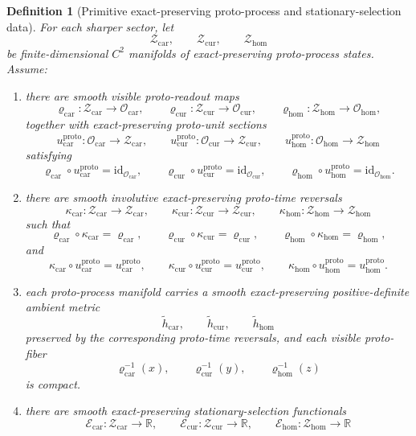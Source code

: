 \documentclass[11pt]{article}
\newcommand{\TensorObjClass}{\mathcal O_{\mathrm{car}}}
\newcommand{\CurObjClass}{\mathcal O_{\mathrm{cur}}}
\newcommand{\HomObjClass}{\mathcal O_{\mathrm{hom}}}
\newcommand{\TensorProtoSpace}{\mathcal Z_{\mathrm{car}}}
\newcommand{\CurProtoSpace}{\mathcal Z_{\mathrm{cur}}}
\newcommand{\HomProtoSpace}{\mathcal Z_{\mathrm{hom}}}
\newcommand{\TensorProtoRead}{\varrho_{\mathrm{car}}}
\newcommand{\CurProtoRead}{\varrho_{\mathrm{cur}}}
\newcommand{\HomProtoRead}{\varrho_{\mathrm{hom}}}
\newcommand{\TensorProtoUnit}{u_{\mathrm{car}}^{\mathrm{proto}}}
\newcommand{\CurProtoUnit}{u_{\mathrm{cur}}^{\mathrm{proto}}}
\newcommand{\HomProtoUnit}{u_{\mathrm{hom}}^{\mathrm{proto}}}
\newcommand{\TensorProtoTimeRev}{\kappa_{\mathrm{car}}}
\newcommand{\CurProtoTimeRev}{\kappa_{\mathrm{cur}}}
\newcommand{\HomProtoTimeRev}{\kappa_{\mathrm{hom}}}
\newcommand{\TensorProtoAmbientMetric}{\widetilde h_{\mathrm{car}}}
\newcommand{\CurProtoAmbientMetric}{\widetilde h_{\mathrm{cur}}}
\newcommand{\HomProtoAmbientMetric}{\widetilde h_{\mathrm{hom}}}
\newcommand{\TensorSelection}{\mathscr E_{\mathrm{car}}}
\newcommand{\CurSelection}{\mathscr E_{\mathrm{cur}}}
\newcommand{\HomSelection}{\mathscr E_{\mathrm{hom}}}
\newtheorem{definition}{Definition}
\begin{document}
\begin{definition}[Primitive exact-preserving proto-process and stationary-selection data]
\label{def:proto_process}
For each sharper sector, let
\[
\TensorProtoSpace,\qquad
\CurProtoSpace,\qquad
\HomProtoSpace
\]
be finite-dimensional \(C^2\) manifolds of exact-preserving proto-process states. Assume:
\begin{enumerate}
    \item there are smooth visible proto-readout maps
    \[
    \TensorProtoRead:\TensorProtoSpace\to\TensorObjClass,\qquad
    \CurProtoRead:\CurProtoSpace\to\CurObjClass,\qquad
    \HomProtoRead:\HomProtoSpace\to\HomObjClass,
    \]
    together with exact-preserving proto-unit sections
    \[
    \TensorProtoUnit:\TensorObjClass\to\TensorProtoSpace,\qquad
    \CurProtoUnit:\CurObjClass\to\CurProtoSpace,\qquad
    \HomProtoUnit:\HomObjClass\to\HomProtoSpace
    \]
    satisfying
    \[
    \TensorProtoRead\circ\TensorProtoUnit=\mathrm{id}_{\TensorObjClass},\qquad
    \CurProtoRead\circ\CurProtoUnit=\mathrm{id}_{\CurObjClass},\qquad
    \HomProtoRead\circ\HomProtoUnit=\mathrm{id}_{\HomObjClass}.
    \]
    \item there are smooth involutive exact-preserving proto-time reversals
    \[
    \TensorProtoTimeRev:\TensorProtoSpace\to\TensorProtoSpace,\qquad
    \CurProtoTimeRev:\CurProtoSpace\to\CurProtoSpace,\qquad
    \HomProtoTimeRev:\HomProtoSpace\to\HomProtoSpace
    \]
    such that
    \[
    \TensorProtoRead\circ\TensorProtoTimeRev=\TensorProtoRead,\qquad
    \CurProtoRead\circ\CurProtoTimeRev=\CurProtoRead,\qquad
    \HomProtoRead\circ\HomProtoTimeRev=\HomProtoRead,
    \]
    and
    \[
    \TensorProtoTimeRev\circ\TensorProtoUnit=\TensorProtoUnit,\qquad
    \CurProtoTimeRev\circ\CurProtoUnit=\CurProtoUnit,\qquad
    \HomProtoTimeRev\circ\HomProtoUnit=\HomProtoUnit.
    \]
    \item each proto-process manifold carries a smooth exact-preserving positive-definite ambient metric
    \[
    \TensorProtoAmbientMetric,\qquad
    \CurProtoAmbientMetric,\qquad
    \HomProtoAmbientMetric
    \]
    preserved by the corresponding proto-time reversals, and each visible proto-fiber
    \[
    \TensorProtoRead^{-1}(x),\qquad
    \CurProtoRead^{-1}(y),\qquad
    \HomProtoRead^{-1}(z)
    \]
    is compact.
    \item there are smooth exact-preserving stationary-selection functionals
    \[
    \TensorSelection:\TensorProtoSpace\to\mathbb R,\qquad
    \CurSelection:\CurProtoSpace\to\mathbb R,\qquad
    \HomSelection:\HomProtoSpace\to\mathbb R
\]
\end{enumerate}
\end{definition}
\end{document}
